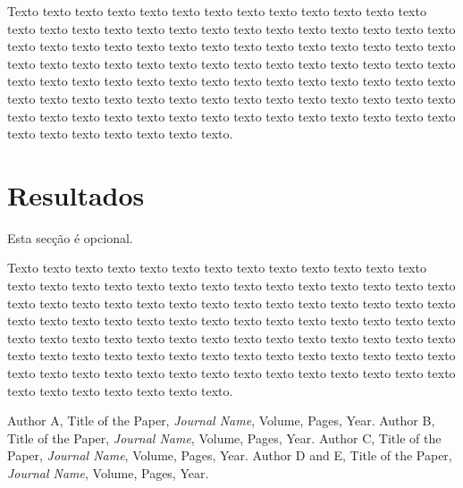 \documentclass[a4paper,10pt,twoside]{article}
\begin{document}
Texto texto texto texto texto texto texto texto texto texto texto texto texto texto texto texto texto texto texto texto texto texto texto texto texto texto texto texto texto texto texto texto texto texto texto texto texto texto texto texto texto texto texto texto texto texto texto texto texto texto texto texto texto texto texto texto texto texto texto texto texto texto texto texto texto texto texto texto texto texto texto texto texto texto texto texto texto texto texto texto texto texto texto texto texto texto texto texto texto texto texto texto texto texto texto texto texto texto texto texto texto texto texto texto.

\section{Resultados}

Esta secção é opcional.

Texto texto texto texto texto texto texto texto texto texto texto texto texto texto texto texto texto texto texto texto texto texto texto texto texto texto texto texto texto texto texto texto texto texto texto texto texto texto texto texto texto texto texto texto texto texto texto texto texto texto texto texto texto texto texto texto texto texto texto texto texto texto texto texto texto texto texto texto texto texto texto texto texto texto texto texto texto texto texto texto texto texto texto texto texto texto texto texto texto texto texto texto texto texto texto texto texto texto texto texto texto texto texto texto.

\begin{thebibliography}{9}

 Author A, Title of the Paper, \textit{Journal Name}, Volume, Pages, Year.
 Author B, Title of the Paper, \textit{Journal Name}, Volume, Pages, Year.
 Author C, Title of the Paper, \textit{Journal Name}, Volume, Pages, Year.
 Author D and E, Title of the Paper, \textit{Journal Name}, Volume, Pages, Year.

\end{thebibliography}
\end{document}
